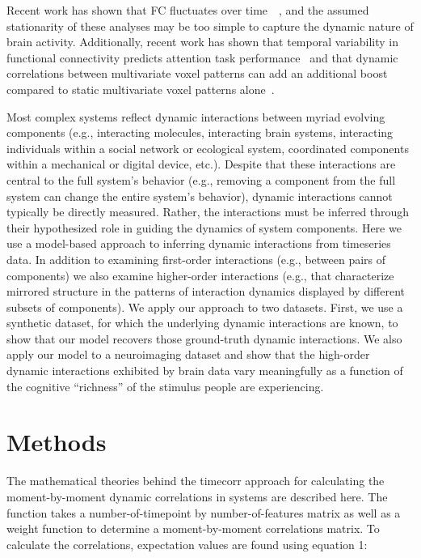Recent work has shown that FC fluctuates over time~\citep{ChanGlov10}~\citep[for review]{LuriEtal18}, and the assumed stationarity of these analyses may be too
simple to capture the dynamic nature of brain activity.  Additionally,
recent work has shown that temporal
variability in functional connectivity predicts attention task
performance~\citep{FongEtal19} and that
dynamic correlations between multivariate voxel patterns can add an
additional boost compared to static multivariate voxel patterns alone~\citep{MannEtal18}.




  
  Most complex systems reflect dynamic interactions between myriad
  evolving components (e.g., interacting molecules, interacting brain
  systems, interacting individuals within a social network or
  ecological system, coordinated components within a mechanical or
  digital device, etc.).  Despite that these interactions are central
  to the full system's behavior (e.g., removing a component from the
  full system can change the entire system's behavior), dynamic
  interactions cannot typically be directly measured.  Rather, the
  interactions must be inferred through their hypothesized role in
  guiding the dynamics of system components.  Here we use a
  model-based approach to inferring dynamic interactions from
  timeseries data.  In addition to examining first-order interactions
  (e.g., between pairs of components) we also examine higher-order
  interactions (e.g., that characterize mirrored structure in the
  patterns of interaction dynamics displayed by different subsets of
  components).  We apply our approach to two datasets.  First, we use
  a synthetic dataset, for which the underlying dynamic interactions
  are known, to show that our model recovers those ground-truth
  dynamic interactions.  We also apply our model to a neuroimaging
  dataset and show that the high-order dynamic interactions exhibited
  by brain data vary meaningfully as a function of the cognitive
  ``richness'' of the stimulus people are experiencing.



\section*{Methods}

The mathematical theories behind the timecorr approach for calculating the moment-by-moment dynamic correlations in systems are described here. The function takes a number-of-timepoint by number-of-features matrix as well as a weight function to determine a moment-by-moment correlations matrix. To calculate the correlations, expectation values are found using equation 1: 

